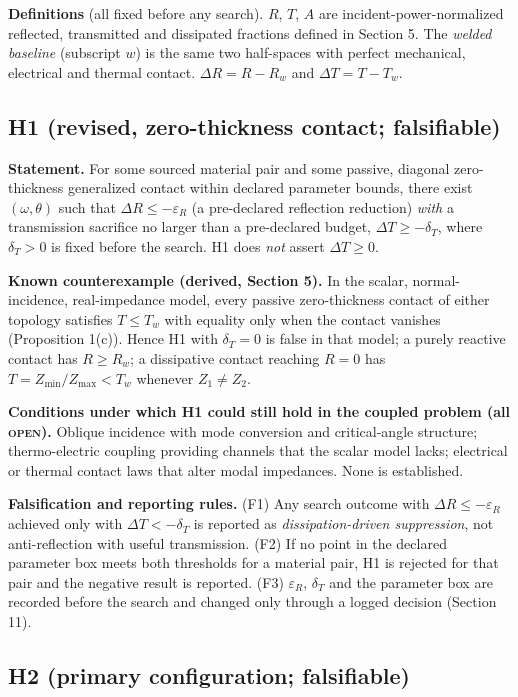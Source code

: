 \documentclass[11pt]{article}
\begin{document}
\textbf{Definitions} (all fixed before any search). $R$, $T$, $A$ are
incident-power-normalized reflected, transmitted and dissipated fractions defined
in Section 5. The \emph{welded baseline} (subscript $w$) is the same two
half-spaces with perfect mechanical, electrical and thermal contact.
$\Delta R = R - R_w$ and $\Delta T = T - T_w$.

\subsection*{H1 (revised, zero-thickness contact; falsifiable)}

\textbf{Statement.} For some sourced material pair and some passive, diagonal
zero-thickness generalized contact within declared parameter bounds, there exist
$(\omega,\theta)$ such that $\Delta R \le -\varepsilon_R$ (a pre-declared
reflection reduction) \emph{with} a transmission sacrifice no larger than a
pre-declared budget, $\Delta T \ge -\delta_T$, where $\delta_T>0$ is fixed before
the search. H1 does \emph{not} assert $\Delta T \ge 0$.

\textbf{Known counterexample (derived, Section 5).} In the scalar,
normal-incidence, real-impedance model, every passive zero-thickness contact of
either topology satisfies $T\le T_w$ with equality only when the contact vanishes
(Proposition 1(c)). Hence H1 with $\delta_T=0$ is false in that model; a purely
reactive contact has $R\ge R_w$; a dissipative contact reaching $R=0$ has
$T=Z_{\min}/Z_{\max}<T_w$ whenever $Z_1\ne Z_2$.

\textbf{Conditions under which H1 could still hold in the coupled problem (all
\textsc{open}).} Oblique incidence with mode conversion and critical-angle
structure; thermo-electric coupling providing channels that the scalar model
lacks; electrical or thermal contact laws that alter modal impedances. None is
established.

\textbf{Falsification and reporting rules.} (F1) Any search outcome with
$\Delta R\le-\varepsilon_R$ achieved only with $\Delta T<-\delta_T$ is reported as
\emph{dissipation-driven suppression}, not anti-reflection with useful
transmission. (F2) If no point in the declared parameter box meets both
thresholds for a material pair, H1 is rejected for that pair and the negative
result is reported. (F3) $\varepsilon_R$, $\delta_T$ and the parameter box are
recorded before the search and changed only through a logged decision
(Section 11).

\subsection*{H2 (primary configuration; falsifiable)}
\end{document}
